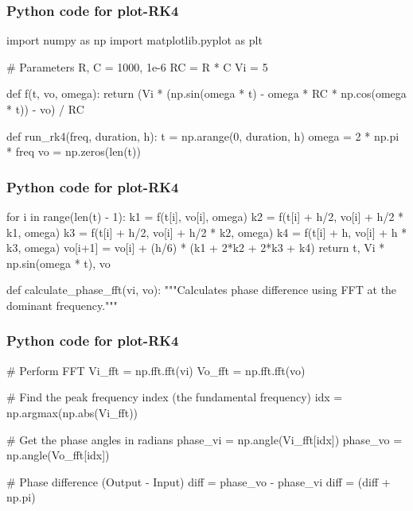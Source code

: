 \documentclass{beamer}
\begin{document}
\begin{frame}[fragile]
\frametitle{Python code for plot-RK4}    
\begin{mycode}
import numpy as np
import matplotlib.pyplot as plt

# Parameters
R, C = 1000, 1e-6
RC = R * C
Vi = 5

def f(t, vo, omega):
    return (Vi * (np.sin(omega * t) - omega * RC * np.cos(omega * t)) - vo) / RC

def run_rk4(freq, duration, h):
    t = np.arange(0, duration, h)
    omega = 2 * np.pi * freq
    vo = np.zeros(len(t))
   
\end{mycode}
\end{frame}
\begin{frame}[fragile]
\frametitle{Python code for plot-RK4}    
\begin{mycode}

    for i in range(len(t) - 1):
        k1 = f(t[i], vo[i], omega)
        k2 = f(t[i] + h/2, vo[i] + h/2 * k1, omega)
        k3 = f(t[i] + h/2, vo[i] + h/2 * k2, omega)
        k4 = f(t[i] + h, vo[i] + h * k3, omega)
        vo[i+1] = vo[i] + (h/6) * (k1 + 2*k2 + 2*k3 + k4)
    return t, Vi * np.sin(omega * t), vo

def calculate_phase_fft(vi, vo):
    """Calculates phase difference using FFT at the dominant frequency."""

\end{mycode}
\end{frame}
\begin{frame}[fragile]
\frametitle{Python code for plot-RK4}    
\begin{mycode}
 # Perform FFT
    Vi_fft = np.fft.fft(vi)
    Vo_fft = np.fft.fft(vo)
    
    # Find the peak frequency index (the fundamental frequency)
    idx = np.argmax(np.abs(Vi_fft))
    
    # Get the phase angles in radians
    phase_vi = np.angle(Vi_fft[idx])
    phase_vo = np.angle(Vo_fft[idx])
    
    # Phase difference (Output - Input)
    diff = phase_vo - phase_vi
    diff = (diff + np.pi) %
    
   
\end{mycode}
\end{frame}
\end{document}
